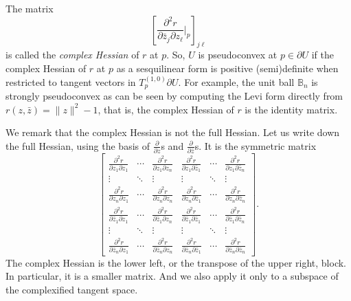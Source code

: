 \documentclass[12pt,openany]{book}
\newcommand{\snorm}[1]{\lVert {#1} \rVert}
\newcommand{\bB}{{\mathbb{B}}}
\newcommand{\myindex}[1]{#1\index{#1}}
\theoremstyle{plain}
\theoremstyle{remark}
\theoremstyle{definition}
\theoremstyle{exercise}
\theoremstyle{example}
\begin{document}
The matrix
\begin{equation*}
\left[ \frac{\partial^2 r}{\partial \bar{z}_j \partial z_\ell} \Big|_p
\right]_{j \ell}
\end{equation*}
is called the
\emph{\myindex{complex Hessian}} of $r$ at $p$.
So, $U$ is pseudoconvex at $p \in \partial U$ if
the complex Hessian
of $r$ at $p$ as a sesquilinear form is positive (semi)definite
when restricted to tangent vectors in $T^{(1,0)}_p \partial U$.
For example, the unit ball $\bB_n$ is
strongly pseudoconvex as can be seen by
computing the 
Levi form directly from $r(z,\bar{z}) = \snorm{z}^2-1$, that is,
the complex Hessian of $r$ is the identity matrix.

We remark that the complex Hessian is not the full Hessian.
Let us write down the full Hessian, using the
basis of $\frac{\partial}{\partial z}$s and
$\frac{\partial}{\partial \bar{z}}$s.  It is
the symmetric matrix
\begin{equation*}
\begin{bmatrix}
\frac{\partial^2 r}{\partial z_1 \partial z_1}
& \cdots &
\frac{\partial^2 r}{\partial z_1 \partial z_n}
&
\frac{\partial^2 r}{\partial z_1 \partial \bar{z}_1} 
& \cdots &
\frac{\partial^2 r}{\partial z_1 \partial \bar{z}_n} 
\\
\vdots & \ddots & \vdots & \vdots & \ddots & \vdots
\\
\frac{\partial^2 r}{\partial z_n \partial z_1}
& \cdots &
\frac{\partial^2 r}{\partial z_n \partial z_n}
&
\frac{\partial^2 r}{\partial z_n \partial \bar{z}_1} 
& \cdots &
\frac{\partial^2 r}{\partial z_n \partial \bar{z}_n} 
\\
\frac{\partial^2 r}{\partial \bar{z}_1 \partial z_1}
& \cdots &
\frac{\partial^2 r}{\partial \bar{z}_1 \partial z_n}
&
\frac{\partial^2 r}{\partial \bar{z}_1 \partial \bar{z}_1} 
& \cdots &
\frac{\partial^2 r}{\partial \bar{z}_1 \partial \bar{z}_n} 
\\
\vdots & \ddots & \vdots & \vdots & \ddots & \vdots
\\
\frac{\partial^2 r}{\partial \bar{z}_n \partial z_1}
& \cdots &
\frac{\partial^2 r}{\partial \bar{z}_n \partial z_n}
&
\frac{\partial^2 r}{\partial \bar{z}_n \partial \bar{z}_1} 
& \cdots &
\frac{\partial^2 r}{\partial \bar{z}_n \partial \bar{z}_n} 
\end{bmatrix}
.
\end{equation*}
The complex Hessian is the lower left,
or the transpose of the upper right, block.  In
particular, it is a smaller matrix. And we also apply it only to a subspace 
of the complexified tangent space.
\end{document}
